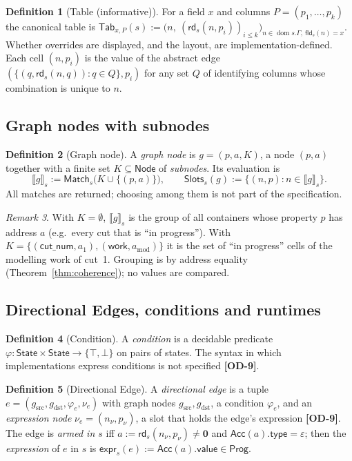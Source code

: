 \documentclass[11pt,a4paper]{article}
\theoremstyle{definition}
\newtheorem{definition}{Definition}[section]
\theoremstyle{plain}
\theoremstyle{remark}
\newtheorem{remark}[definition]{Remark}
\newcommand{\od}[1]{\textsf{\textbf{\textcolor{BrickRed}{[OD-#1]}}}}
\newcommand{\Prog}{\mathsf{Prog}}
\newcommand{\Nod}{\mathsf{Node}}
\newcommand{\Stt}{\mathsf{State}}
\newcommand{\nul}{\mathbf{0}}
\newcommand{\tExp}{\varepsilon}
\newcommand{\dom}{\operatorname{dom}}
\newcommand{\rd}{\mathsf{rd}}
\newcommand{\fld}{\mathsf{fld}}
\newcommand{\Match}{\mathsf{Match}}
\newcommand{\Acc}{\mathsf{Acc}}
\begin{document}
\begin{definition}[Table (informative)]\label{def:table}
For a field $x$ and columns $P=(p_1,\dots,p_k)$ the canonical table is
$\mathsf{Tab}_{x,P}(s):=\big(n,\ (\rd_s(n,p_i))_{i\le k}\big)_{n\in\dom s.\Gamma,\ \fld_s(n)=x}$.
Whether overrides are displayed, and the layout, are implementation-defined.
Each cell $(n,p_i)$ is the value of the abstract edge $(\{(q,\rd_s(n,q)) : q\in Q\},p_i)$ for any set $Q$ of identifying columns whose combination is unique to $n$.
\end{definition}

\subsection{Graph nodes with subnodes}

\begin{definition}[Graph node]\label{def:gnode}
A \emph{graph node} is $g=(p,a,K)$, a node $(p,a)$ together with a finite set $K\subseteq\Nod$ of \emph{subnodes}. Its evaluation is
\[
\llbracket g\rrbracket_s:=\Match_s\big(K\cup\{(p,a)\}\big),\qquad
\mathsf{Slots}_s(g):=\{(n,p) : n\in\llbracket g\rrbracket_s\}.
\]
All matches are returned; choosing among them is not part of the specification.
\end{definition}

\begin{remark}
With $K=\emptyset$, $\llbracket g\rrbracket_s$ is the group of all containers whose property $p$ has address $a$ (e.g.\ every cut that is ``in progress'').
With $K=\{(\mathsf{cut\_num},a_1),(\mathsf{work},a_{\mathrm{mod}})\}$ it is the set of ``in progress'' cells of the modelling work of cut~1.
Grouping is by address equality (Theorem~\ref{thm:coherence}); no values are compared.
\end{remark}

\subsection{Directional Edges, conditions and runtimes}

\begin{definition}[Condition]\label{def:cond}
A \emph{condition} is a decidable predicate $\varphi:\Stt\times\Stt\to\{\top,\bot\}$ on pairs of states.
The syntax in which implementations express conditions is not specified \od{9}.
\end{definition}

\begin{definition}[Directional Edge]\label{def:dedge}
A \emph{directional edge} is a tuple $e=(g_{\mathrm{src}},g_{\mathrm{dst}},\varphi_e,\nu_e)$ with graph nodes $g_{\mathrm{src}},g_{\mathrm{dst}}$,
a condition $\varphi_e$, and an \emph{expression node} $\nu_e=(n_\nu,p_\nu)$, a slot that holds the edge's expression \od{9}.
The edge is \emph{armed in $s$} iff $a:=\rd_s(n_\nu,p_\nu)\neq\nul$ and $\Acc(a).\mathsf{type}=\tExp$;
then the \emph{expression} of $e$ in $s$ is $\mathsf{expr}_s(e):=\Acc(a).\mathsf{value}\in\Prog$.
\end{definition}
\end{document}
